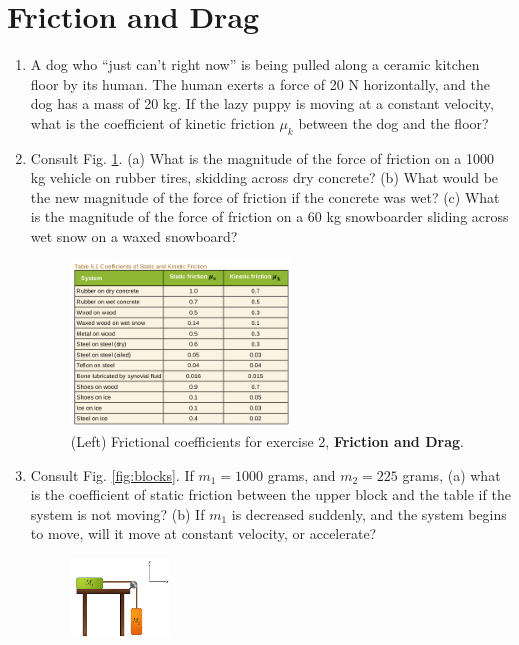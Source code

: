 \documentclass[10pt]{article}
\begin{document}
\section{Friction and Drag}
\small
\begin{enumerate}
\item A dog who ``just can't right now'' is being pulled along a ceramic kitchen floor by its human.  The human exerts a force of 20 N horizontally, and the dog has a mass of 20 kg.  If the lazy puppy is moving at a constant velocity, what is the coefficient of kinetic friction $\mu_k$ between the dog and the floor? \\ \vspace{1.5cm}
\item Consult Fig. \ref{fig:coeff}. (a) What is the magnitude of the force of friction on a 1000 kg vehicle on rubber tires, skidding across dry concrete? (b) What would be the new magnitude of the force of friction if the concrete was wet? (c) What is the magnitude of the force of friction on a 60 kg snowboarder sliding across wet snow on a waxed snowboard? \\ \vspace{1.5cm}
\begin{figure}
\centering
\includegraphics[width=0.55\textwidth]{figures/coefficients.png}
\caption{\label{fig:coeff} (Left) Frictional coefficients for exercise 2, \textbf{Friction and Drag}.}
\end{figure}
\item Consult Fig. \ref{fig:blocks}.  If $m_1 = 1000$ grams, and $m_2 = 225$ grams, (a) what is the coefficient of static friction between the upper block and the table if the system is not moving? (b) If $m_1$ is decreased suddenly, and the system begins to move, will it move at constant velocity, or accelerate?\vspace{1cm}
\begin{figure}[hb]
\centering
\includegraphics[width=0.25\textwidth]{figures/table.png}

\end{figure}
\end{enumerate}
\end{document}

